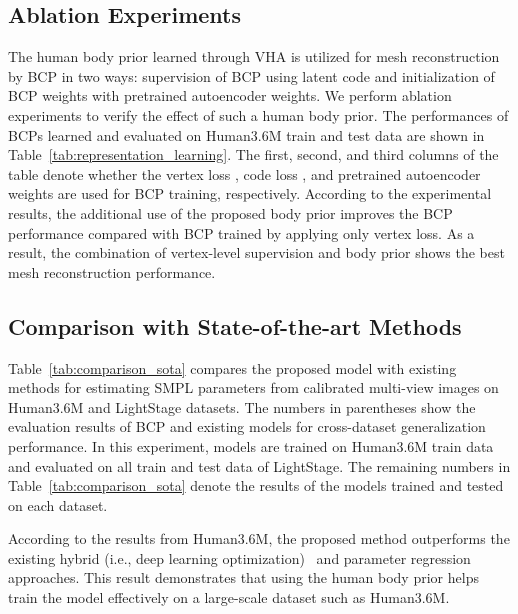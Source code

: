 \documentclass{article}
\begin{document}
\subsection{Ablation Experiments}
\label{ssec:ablation_experiments}

The human body prior learned through VHA is utilized for mesh reconstruction by BCP in two ways: supervision of BCP using latent code and initialization of BCP weights with pretrained autoencoder weights. We perform ablation experiments to verify the effect of such a human body prior. The performances of BCPs learned and evaluated on Human3.6M train and test data are shown in Table~\ref{tab:representation_learning}. The first, second, and third columns of the table denote whether the vertex loss , code loss , and pretrained autoencoder weights are used for BCP training, respectively. According to the experimental results, the additional use of the proposed body prior improves the BCP performance compared with BCP trained by applying only vertex loss. As a result, the combination of vertex-level supervision and body prior shows the best mesh reconstruction performance.













\subsection{Comparison with State-of-the-art Methods}
\label{ssec:comparison_sota}

Table~\ref{tab:comparison_sota} compares the proposed model with existing methods for estimating SMPL parameters from calibrated multi-view images on Human3.6M and LightStage datasets. The numbers in parentheses show the evaluation results of BCP and existing models for cross-dataset generalization performance. In this experiment, models are trained on Human3.6M train data and evaluated on all train and test data of LightStage. The remaining numbers in Table~\ref{tab:comparison_sota} denote the results of the models trained and tested on each dataset.

According to the results from Human3.6M, the proposed method outperforms the existing hybrid (i.e., deep learning  optimization)~\cite{Chun_2023_WACV, 2019_LT, lightcap2021} and parameter regression~\cite{2020_Shin} approaches. This result demonstrates that using the human body prior helps train the model effectively on a large-scale dataset such as Human3.6M.
\end{document}
